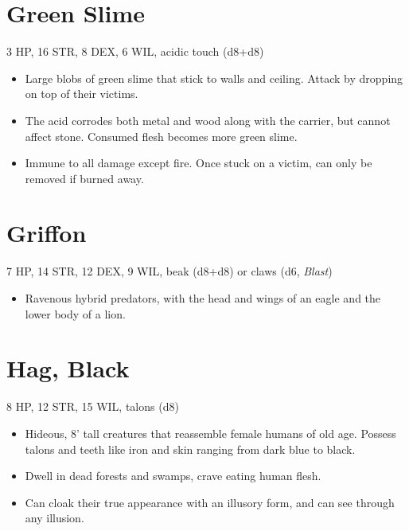 \documentclass[
  10pt,
  american,
]{article}
\begin{document}
\hypertarget{green-slime}{%
\section{Green Slime}\label{green-slime}}

3 HP, 16 STR, 8 DEX, 6 WIL, acidic touch (d8+d8)

\begin{samepage}
\begin{itemize}
\setlength\itemsep{-.5em}
\item Large blobs of green slime that stick to walls and ceiling. Attack by dropping on top of their victims.
\item The acid corrodes both metal and wood along with the carrier, but cannot affect stone. Consumed flesh becomes more green slime.
\item Immune to all damage except fire. Once stuck on a victim, can only be removed if burned away.
\end{itemize}
\end{samepage}

\hypertarget{griffon}{%
\section{Griffon}\label{griffon}}

7 HP, 14 STR, 12 DEX, 9 WIL, beak (d8+d8) or claws (d6, \emph{Blast})

\begin{samepage}
\begin{itemize}
\setlength\itemsep{-.5em}
\item Ravenous hybrid predators, with the head and wings of an eagle and the lower body of a lion.
\end{itemize}
\end{samepage}

\hypertarget{hag-black}{%
\section{Hag, Black}\label{hag-black}}

8 HP, 12 STR, 15 WIL, talons (d8)

\begin{samepage}
\begin{itemize}
\setlength\itemsep{-.5em}
\item Hideous, 8' tall creatures that reassemble female humans of old age. Possess talons and teeth like iron and skin ranging from dark blue to black.
\item Dwell in dead forests and swamps, crave eating human flesh.
\item Can cloak their true appearance with an illusory form, and can see through any illusion.
\end{itemize}
\end{samepage}
\end{document}
